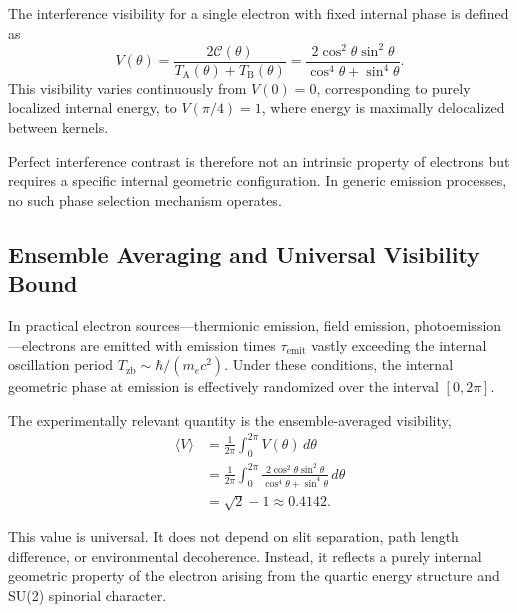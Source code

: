 \documentclass[%
 reprint,
 amsmath,amssymb,
 aps,
 prb,
]{revtex4-2}
\numberwithin{equation}{section}
\begin{document}
The interference visibility for a single electron with fixed internal phase is defined as
\begin{equation}
V(\theta) = \frac{2\mathcal{C}(\theta)}{T_{\mathrm{A}}(\theta) + T_{\mathrm{B}}(\theta)}
= \frac{2\cos^2\theta\sin^2\theta}{\cos^4\theta + \sin^4\theta}.
\label{eq:visibility_function}
\end{equation}
This visibility varies continuously from $V(0) = 0$, corresponding to purely localized internal energy, to $V(\pi/4) = 1$, where energy is maximally delocalized between kernels.

Perfect interference contrast is therefore not an intrinsic property of electrons but requires a specific internal geometric configuration. In generic emission processes, no such phase selection mechanism operates.


\subsection{Ensemble Averaging and Universal Visibility Bound}
\label{subsec:ensemble_average}

In practical electron sources---thermionic emission, field emission, photoemission---electrons are emitted with emission times $\tau_{\mathrm{emit}}$ vastly exceeding the internal oscillation period $T_{\mathrm{zb}} \sim \hbar/(m_e c^2)$. Under these conditions, the internal geometric phase at emission is effectively randomized over the interval $[0, 2\pi]$.

The experimentally relevant quantity is the ensemble-averaged visibility,
\begin{equation}
\begin{aligned}
\langle V \rangle &= \frac{1}{2\pi} \int_0^{2\pi} V(\theta) \, d\theta \\
&= \frac{1}{2\pi} \int_0^{2\pi} \frac{2\cos^2\theta\sin^2\theta}{\cos^4\theta + \sin^4\theta} \, d\theta \\
&= \sqrt{2} - 1 \approx 0.4142.
\end{aligned}
\label{eq:ensemble_visibility}
\end{equation}

This value is universal. It does not depend on slit separation, path length difference, or environmental decoherence. Instead, it reflects a purely internal geometric property of the electron arising from the quartic energy structure and SU(2) spinorial character.
\end{document}
